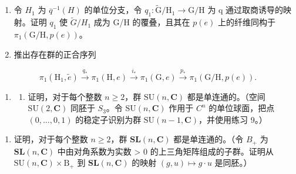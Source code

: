 \begin{enumerate}
\def\labelenumi{\alph{enumi})}
\item
  令 \(H_{1}\) 为 \(\overline{q}^{-1}(H)\) 的单位分支，令 \(q_{1}\colon\widetilde{\mathrm{G}}/\mathrm{H}_{1}\to\mathrm{G}/\mathrm{H}\) 为 q 通过取商诱导的映射。证明 \(q_{1}\) 使 \(\widetilde{G}/H_{1}\) 成为 G/H 的覆叠，且其在 \(p(e)\) 上的纤维同构于 \(\pi_{1}(\mathrm{G}/\mathrm{H},p(e))\)。
\item
  推出存在群的正合序列
\end{enumerate}

\[
\pi_ {1} (\mathrm{H} _ {1}, \widetilde {e}) \xrightarrow {q _ {*}} \pi_ {1} (\mathrm{H}, e) \xrightarrow {i _ {*}} \pi_ {1} (\mathrm{G}, e) \xrightarrow {p _ {*}} \pi_ {1} (\mathrm{G} / \mathrm{H}, p (e)).
\]

\begin{enumerate}
\def\labelenumi{\arabic{enumi})}
\setcounter{enumi}{9}
\tightlist
\item
  \begin{enumerate}
  \def\labelenumii{\alph{enumii})}
  \tightlist
  \item
    证明，对于每个整数 \(n \geqslant 2\)，群 \(\mathrm{SU}(n, \mathbf{C})\) 都是单连通的。（空间 \(\mathrm{SU}(2, \mathbf{C})\) 同胚于 \(S_{3}\)。令 \(\mathrm{SU}(n, \mathbf{C})\) 作用于 \(C^{n}\) 的单位球面，把点 \((0, \ldots, 0, 1)\) 的稳定子识别为群 \(\mathrm{SU}(n - 1, \mathbf{C})\)，并使用练习 9。）
  \end{enumerate}
\end{enumerate}

\begin{enumerate}
\def\labelenumi{\alph{enumi})}
\setcounter{enumi}{1}
\tightlist
\item
  证明，对于每个整数 \(n \geqslant 2\)，群 \(\mathbf{SL}(n, \mathbf{C})\) 都是单连通的。（令 \(B_{+}\) 为 \(\mathbf{SL}(n, \mathbf{C})\) 中由对角系数为实数 \textgreater{} 0 的上三角矩阵组成的子群。证明从 \(\mathrm{SU}(n, \mathbf{C}) \times \mathrm{B}_{+}\) 到 \(\mathbf{SL}(n, \mathbf{C})\) 的映射 \((g, u) \mapsto g \cdot u\) 是同胚。）
\end{enumerate}

